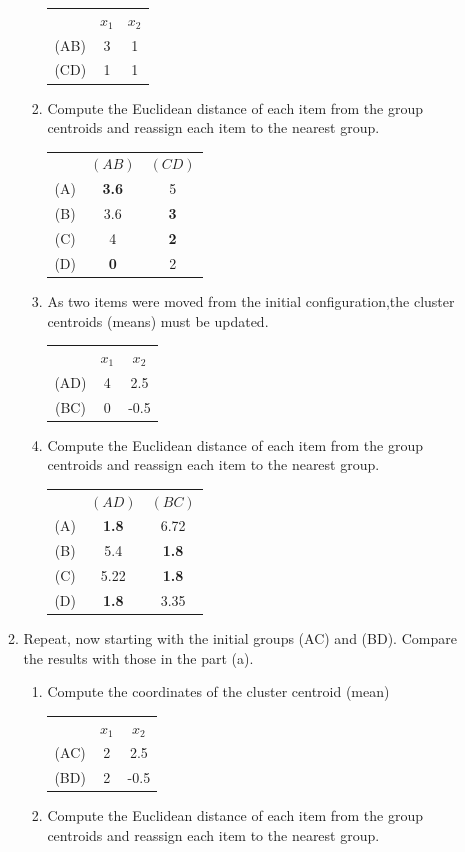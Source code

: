 \documentclass[12pt,a4paper]{paper}
\begin{document}
\begin{enumerate}
\begin{enumerate}
\begin{enumerate}
\begin{tabular}{ccc}
&$x_{1}$&$x_{2}$\\
(AB)&3&1\\
(CD)&1&1
\end{tabular}
\item Compute the Euclidean distance of each item from the group centroids and reassign each item to the nearest group.\\
\begin{tabular}{ccc}
&$(AB)$&$(CD)$\\
(A)&\textbf{3.6}&5\\
(B)&3.6&\textbf{3}\\
(C)&4&\textbf{2}\\
(D)&\textbf{0}&2\\
\end{tabular}
\item As two items were moved from the initial configuration,the cluster centroids (means) must be updated.\\
\begin{tabular}{ccc}
&$x_{1}$&$x_{2}$\\
(AD)&4&2.5\\
(BC)&0&-0.5
\end{tabular}
\item Compute the Euclidean distance of each item from the group centroids and reassign each item to the nearest group.\\
\begin{tabular}{ccc}
&$(AD)$&$(BC)$\\
(A)&\textbf{1.8}&6.72\\
(B)&5.4&\textbf{1.8}\\
(C)&5.22&\textbf{1.8}\\
(D)&\textbf{1.8}&3.35\\
\end{tabular}
\end{enumerate}
\item Repeat, now starting with the initial groups (AC) and (BD). Compare the results with those in the part (a).
\begin{enumerate}
\item Compute the coordinates of the cluster centroid (mean)\\
\begin{tabular}{ccc}
&$x_{1}$&$x_{2}$\\
(AC)&2&2.5\\
(BD)&2&-0.5
\end{tabular}
\item Compute the Euclidean distance of each item from the group centroids and reassign each item to the nearest group.\\

\end{enumerate}
\end{enumerate}
\end{enumerate}
\end{document}
